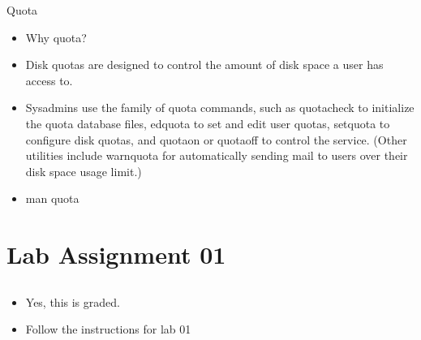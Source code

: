 \documentclass{beamer}
\begin{document}
\begin{frame}{Quota}
\begin{itemize}
\item Why quota?
\item Disk quotas are designed to control the amount of disk space a user has access to. 
\item Sysadmins use the family of quota commands, such as quotacheck to initialize the quota database files, edquota to set and edit user quotas, setquota to configure disk quotas, and quotaon or quotaoff to control the service. (Other utilities include warnquota for automatically sending mail to users over their disk space usage limit.)
\item man quota
\end{itemize}
\end{frame}

\section{Lab Assignment 01}
\subsection{}
\begin{frame}{}
\begin{itemize}
\item Yes, this is graded.
\item Follow the instructions for lab 01
\end{itemize}
\end{frame}

\end{document}
